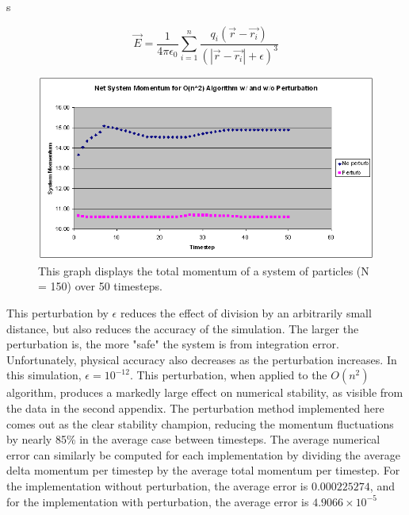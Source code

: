 s\documentclass[10pt]{article}
\begin{document}
$$\vec{E} = \frac{1}{4\pi\epsilon_0}\sum_{i = 1}^n \frac{q_i (\vec{r} - \vec{r_i})}{(|\vec{r} - \vec{r_i}| + \epsilon)^3}$$ 

\begin{figure}[ht]
	\centering
		\includegraphics[scale = 0.75]{graphOfPerturbMomentum.PNG}
	\caption{This graph displays the total momentum of a system of particles (N = 150) over 50 timesteps.}
	\label{fig:graphOfPerturbMomentum}
\end{figure}

This perturbation by $\epsilon$ reduces the effect of division by an arbitrarily small distance, but also reduces the accuracy of the simulation. The larger the perturbation is, the more "safe" the system is from integration error. Unfortunately, physical accuracy also decreases as the perturbation increases. In this simulation, $\epsilon = 10^{-12}$. This perturbation, when applied to the $O(n^2)$ algorithm, produces a markedly large effect on numerical stability, as visible from the data in the second appendix. The perturbation method implemented here comes out as the clear stability champion, reducing the momentum fluctuations by nearly 85\% in the average case between timesteps. The average numerical error can similarly be computed for each implementation by dividing the average delta momentum per timestep by the average total momentum per timestep. For the implementation without perturbation, the average error is $0.000225274$, and for the implementation with perturbation, the average error is $4.9066 \times 10^{-5}$
\end{document}
